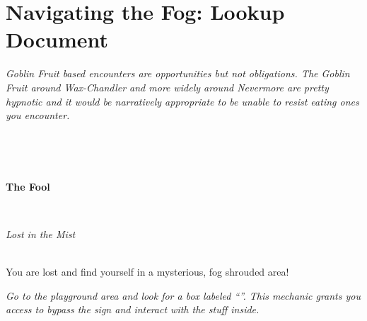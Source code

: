 \documentclass[white]{gl2018}
\begin{document}
\name{\wFog{}}

\section*{Navigating the Fog: Lookup Document}
\emph{Goblin Fruit based encounters are opportunities but not obligations. The Goblin Fruit around Wax-Chandler and more widely around Nevermore are pretty hypnotic and it would be narratively appropriate to be unable to resist eating ones you encounter.}
\newcommand{\areastart}[2]{ \begin{huge}{\bf {#1}} \end{huge} \\ \begin{large} \emph{#2} \end{large}\\}
\newcommand{\hobgoblins}[3]{Look!  There!  #1 hobgoblins around a fire...  

\begin{itemize}
\item If you are alone, sneak past.
\item If more than half of your party has lit candles, the hobgoblins flee.
\item If half or fewer of your party has lit candles, fight!  Make #2 Physical checks at #3.  For each failed check, one member of your party with an unlit candle should take one damage.  If more than one member of your party has an unlit candle, you may choose amongst yourselves who takes the damage.
\end{itemize}}
\newenvironment{location}[2]{\begin{minipage}{\textwidth}\areastart{#1}{#2}}{\end{minipage}\vspace{0.3in}}
\newcommand{\lost}[1]{You are lost and find yourself in #1!  That's not where you meant to go....\\{\em Go directly to #1 now.}}
\begin{location}{\hspace{0.5in}}{ }
\end{location}
\begin{location}{The Fool}{Lost in the Mist}
You are lost and find yourself in a mysterious, fog shrouded area!

{\em Go to the playground area and look for a box labeled ``\sSculptureGardenWarning{}''.  This mechanic grants you access to bypass the sign and interact with the stuff inside.}
\end{location}
\end{document}
